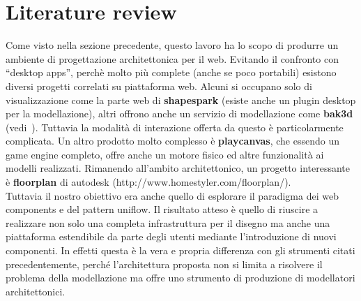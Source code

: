 \section{Literature review}

Come visto nella sezione precedente, questo lavoro ha lo scopo di produrre un ambiente di progettazione architettonica per il web. Evitando il confronto con ``desktop apps'', perch\`e molto pi\`u complete (anche se poco portabili) esistono diversi progetti correlati su piattaforma web. Alcuni si occupano solo di visualizzazione come la parte web di \textbf{shapespark} (esiste anche un plugin desktop per la modellazione), altri offrono anche un servizio di modellazione come \textbf{bak3d} (vedi~\cite{Spini:2016:WIA:2945292.2945309}). Tuttavia la modalit\`a di interazione offerta da questo \`e particolarmente complicata. Un altro prodotto molto complesso \`e \textbf{playcanvas}, che essendo un game engine completo, offre anche un motore fisico ed altre funzionalit\`a ai modelli realizzati. Rimanendo all'ambito architettonico, un progetto interessante \`e \textbf{floorplan} di autodesk (http://www.homestyler.com/floorplan/).\\
Tuttavia il nostro obiettivo era anche quello di esplorare il paradigma dei web components e del pattern uniflow. Il risultato atteso \`e quello di riuscire a realizzare non solo una completa infrastruttura per il disegno ma anche una piattaforma estendibile da parte degli utenti mediante l'introduzione di nuovi componenti. In effetti questa \`e la vera e propria differenza con gli strumenti citati precedentemente, perché l'architettura proposta non si limita a risolvere il problema della modellazione ma offre uno strumento di produzione di modellatori architettonici.